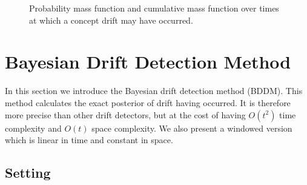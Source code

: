 \begin{figure}
    \centering
    \caption{Probability mass function and cumulative mass function over times at which a concept drift may have occurred.}
    \label{fig:bayes_pdf}
\end{figure}


\section{Bayesian Drift Detection Method} \label{BDD:bddm}

In this section we introduce the Bayesian drift detection method (BDDM). This method calculates the exact posterior of drift having occurred. It is therefore more precise than other drift detectors, but at the cost of having $O(t^2)$ time complexity and $O(t)$ space complexity. We also present a windowed version which is linear in time and constant in space.

\subsection{Setting}

